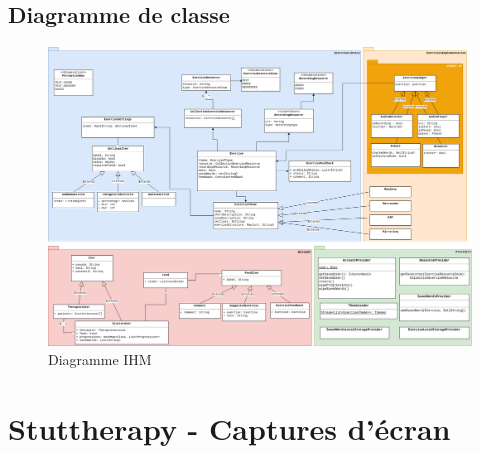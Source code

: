 \begin{appendices}
\begin{landscape}
\chapter{Diagramme de classe}
\label{appendix:class}
\vspace{-35pt}
\begin{figure}[H]
  \includegraphics[width=0.9\linewidth]{content/imgs/app_class_diagram.png}
  \caption*{Diagramme IHM}
\end{figure}
\end{landscape}

\chapter{Stuttherapy - Captures d'écran}
\label{appendix:screenshots}




\end{appendices}

